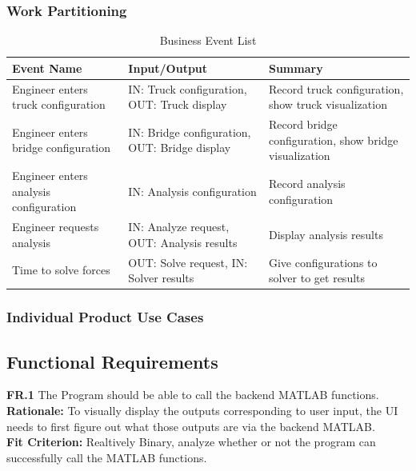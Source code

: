 \documentclass[12pt]{article}
\begin{document}
\subsubsection{Work Partitioning}

\begin{table}[hp]
  \caption{Business Event List} \label{TblEventList}
  \begin{tabular}{p{} | p{} | p{}}
  \toprule
  \textbf{Event Name} & \textbf{Input/Output} & \textbf{Summary}\\
  \midrule
  Engineer enters truck configuration & IN: Truck configuration, OUT: Truck display & Record truck configuration, show truck visualization\\
  \midrule
  Engineer enters bridge configuration & IN: Bridge configuration, OUT: Bridge display & Record bridge configuration, show bridge visualization\\
  \midrule
  Engineer enters analysis configuration & IN: Analysis configuration & Record analysis configuration\\
  \midrule
  Engineer requests analysis & IN: Analyze request, OUT: Analysis results & Display analysis results\\
  \midrule
  Time to solve forces & OUT: Solve request, IN: Solver results & Give configurations to solver to get results\\
  \bottomrule
\end{tabular}
\end{table}

\subsubsection{Individual Product Use Cases}

\subsection{Functional Requirements}
  \textbf{FR.1} The Program should be able to call the backend MATLAB functions. \\
  \textbf{Rationale:} To visually display the outputs corresponding to user input, the UI needs to first figure out what those outputs are via the backend MATLAB.\\
  \textbf{Fit Criterion:} Realtively Binary, analyze whether or not the program can successfully call the MATLAB functions.\\\\
  
\end{document}
